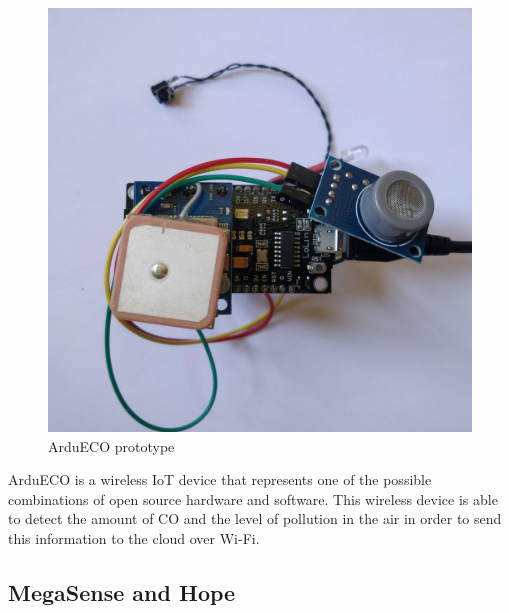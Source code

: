 		\begin{figure}[H]
			\centering
			\includegraphics[width=.5\textwidth]{resources/img/ardueco_picture}
			\caption{ArduECO prototype}
		\end{figure}
	
		ArduECO is a wireless IoT device that represents one of the
		possible combinations of open source hardware and software.
		This wireless device is able to detect the amount of CO and the
		level of pollution in the air in order to send this information to
		the cloud over Wi-Fi. 
	
		

	\subsection{MegaSense and Hope}
	
		
%		
%		
%		
%
